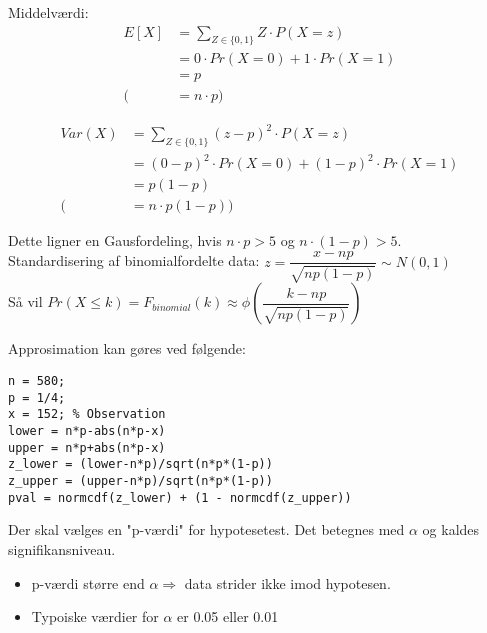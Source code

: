 \documentclass[Main]{subfiles}
\begin{document}
\begin{theo}[Binomialfordeling]
Middelværdi:
\begin{align*}
E[X] &= \sum_{Z \in \{ 0,1\}}Z \cdot P(X=z) \\
	&= 0 \cdot Pr(X=0)+1 \cdot Pr(X=1) \\
	&= p \\
	(&= n \cdot p)
\end{align*}


\begin{align*}
Var(X) &=\sum_{Z \in \{ 0,1\}}(z-p)^2 \cdot P(X=z) \\
	&= (0-p)^2 \cdot Pr(X=0) + (1-p)^2 \cdot Pr(X=1) \\
	&= p(1-p) \\
	(&= n \cdot p(1-p))
\end{align*}

Dette ligner en Gausfordeling, hvis $n \cdot p > 5$ og $n \cdot(1-p) > 5$. 
\\
Standardisering af binomialfordelte data: $z = \dfrac{x-np}{\sqrt{np(1-p)}} \sim N(0,1)$
\\
Så vil $Pr(X \leq k) = F_{binomial}(k) \approx \phi\left( \dfrac{k-np}{\sqrt{np(1-p)}}\right)$

Approsimation kan gøres ved følgende:
\begin{lstlisting}[style=Code-Matlab]
%% Approksimativ P-vErdi
n = 580;
p = 1/4;
x = 152; % Observation
lower = n*p-abs(n*p-x)
upper = n*p+abs(n*p-x)
z_lower = (lower-n*p)/sqrt(n*p*(1-p))
z_upper = (upper-n*p)/sqrt(n*p*(1-p))
pval = normcdf(z_lower) + (1 - normcdf(z_upper))
\end{lstlisting}

\end{theo}








\begin{theo}[Signifikansniveau]
Der skal vælges en "p-værdi" for hypotesetest.
Det betegnes med $\alpha$ og kaldes signifikansniveau.

\begin{itemize}
	\item p-værdi større end $\alpha \Rightarrow$ data strider ikke imod hypotesen.
	\item Typoiske værdier for $\alpha$ er 0.05 eller 0.01
\end{itemize}

\end{theo}
\end{document}
